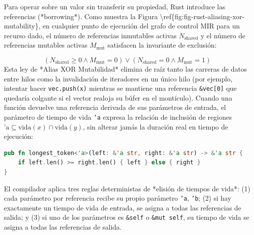 \documentclass{book}
\begin{document}
Para operar sobre un valor sin transferir su propiedad, Rust introduce las referencias (*borrowing*). Como muestra la Figura \textbackslash{}ref\{fig:fig-rust-aliasing-xor-mutability\}, en cualquier punto de ejecución del grafo de control MIR para un recurso dado, el número de referencias inmutables activas \(N_{\text{shared}}\) y el número de referencias mutables activas \(M_{\text{mut}}\) satisfacen la invariante de exclusión:

\[
(N_{\text{shared}} \ge 0 \land M_{\text{mut}} = 0) \lor (N_{\text{shared}} = 0 \land M_{\text{mut}} = 1)
\]
Esta ley de *Alias XOR Mutabilidad* elimina de raíz tanto las carreras de datos entre hilos como la invalidación de iteradores en un único hilo (por ejemplo, intentar hacer \texttt{vec.push(x)} mientras se mantiene una referencia \texttt{\&vec[0]} que quedaría colgante si el vector realoja su búfer en el montículo). Cuando una función devuelve una referencia derivada de sus parámetros de entrada, el parámetro de tiempo de vida \texttt{'a} expresa la relación de inclusión de regiones \(\text{'a} \subseteq \text{vida}(x) \cap \text{vida}(y)\), sin alterar jamás la duración real en tiempo de ejecución:
\begin{lstlisting}[style=studium,language={Rust}]
pub fn longest_token<'a>(left: &'a str, right: &'a str) -> &'a str {
    if left.len() >= right.len() { left } else { right }
}
\end{lstlisting}
El compilador aplica tres reglas deterministas de *elisión de tiempos de vida*: (1) cada parámetro por referencia recibe su propio parámetro \texttt{'a}, \texttt{'b}; (2) si hay exactamente un tiempo de vida de entrada, se asigna a todas las referencias de salida; y (3) si uno de los parámetros es \texttt{\&self} o \texttt{\&mut self}, su tiempo de vida se asigna a todas las referencias de salida.
\end{document}
